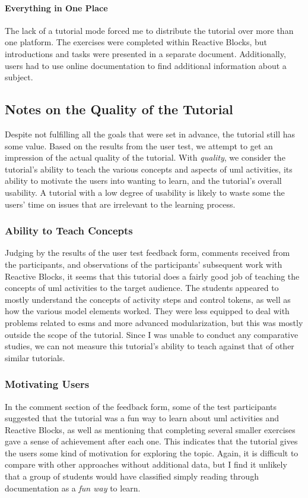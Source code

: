 \paragraph{Everything in One Place} The lack of a tutorial mode forced me to distribute the tutorial over more than one platform. The exercises were completed within Reactive Blocks, but introductions and tasks were presented in a separate document. Additionally, users had to use online documentation to find additional information about a subject.

\subsection{Notes on the Quality of the Tutorial}
\label{sec:tutorial_quality}
Despite not fulfilling all the goals that were set in advance, the tutorial still has some value. Based on the results from the user test, we attempt to get an impression of the actual quality of the tutorial. With \emph{quality}, we consider the tutorial's ability to teach the various concepts and aspects of \gls{uml} activities, its ability to motivate the users into wanting to learn, and the tutorial's overall usability. A tutorial with a low degree of usability is likely to waste some the users' time on issues that are irrelevant to the learning process.

\subsubsection{Ability to Teach Concepts}
Judging by the results of the user test feedback form, comments received from the participants, and observations of the participants' subsequent work with Reactive Blocks, it seems that this tutorial does a fairly good job of teaching the concepts of \gls{uml} activities to the target audience. The students appeared to mostly understand the concepts of activity steps and control tokens, as well as how the various model elements worked. They were less equipped to deal with problems related to \glspl{esm} and more advanced modularization, but this was mostly outside the scope of the tutorial. Since I was unable to conduct any comparative studies, we can not measure this tutorial's ability to teach against that of other similar tutorials.

\subsubsection{Motivating Users}
In the comment section of the feedback form, some of the test participants suggested that the tutorial was a fun way to learn about \gls{uml} activities and Reactive Blocks, as well as mentioning that completing several smaller exercises gave a sense of achievement after each one. This indicates that the tutorial gives the users some kind of motivation for exploring the topic. Again, it is difficult to compare with other approaches without additional data, but I find it unlikely that a group of students would have classified simply reading through documentation as a \emph{fun way} to learn.


